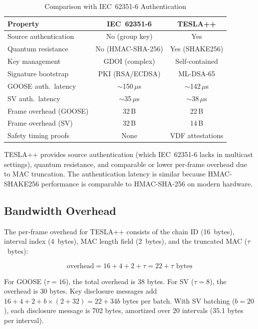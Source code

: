 \documentclass[conference,10pt]{IEEEtran}
\newcommand{\GOOSE}{\textsf{GOOSE}}
\newcommand{\SV}{\textsf{SV}}
\begin{document}
\begin{table}[t]
\centering
\caption{Comparison with IEC~62351-6 Authentication}
\label{tab:comparison}
\begin{tabular}{@{}lcc@{}}
\toprule
\textbf{Property} & \textbf{IEC~62351-6} & \textbf{TESLA++} \\
\midrule
Source authentication   & No (group key)     & Yes \\
Quantum resistance      & No (HMAC-SHA-256)  & Yes (SHAKE256) \\
Key management          & GDOI (complex)     & Self-contained \\
Signature bootstrap     & PKI (RSA/ECDSA)    & ML-DSA-65 \\
GOOSE auth.\ latency    & $\sim$150\,$\mu$s   & $\sim$142\,$\mu$s \\
SV auth.\ latency       & $\sim$35\,$\mu$s    & $\sim$38\,$\mu$s \\
Frame overhead (GOOSE)  & 32\,B              & 22\,B \\
Frame overhead (SV)     & 32\,B              & 14\,B \\
Safety timing proofs    & None               & VDF attestations \\
\bottomrule
\end{tabular}
\end{table}

TESLA++ provides source authentication (which IEC~62351-6 lacks in multicast settings), quantum resistance, and comparable or lower per-frame overhead due to MAC truncation. The authentication latency is similar because HMAC-SHAKE256 performance is comparable to HMAC-SHA-256 on modern hardware.

\subsection{Bandwidth Overhead}

The per-frame overhead for TESLA++ consists of the chain ID (16~bytes), interval index (4~bytes), MAC length field (2~bytes), and the truncated MAC ($\tau$~bytes):

\begin{equation}
  \text{overhead} = 16 + 4 + 2 + \tau = 22 + \tau \text{ bytes}
\end{equation}

For \GOOSE{} ($\tau = 16$), the total overhead is 38 bytes. For \SV{} ($\tau = 8$), the overhead is 30 bytes. Key disclosure messages add $16 + 4 + 2 + b \times (2 + 32) = 22 + 34b$ bytes per batch. With \SV{} batching ($b = 20$), each disclosure message is 702 bytes, amortized over 20 intervals (35.1 bytes per interval).
\end{document}
